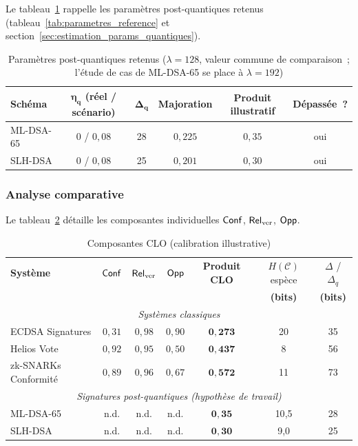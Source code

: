 \begin{sloppypar}
Le tableau~\ref{tab:coherence_pqc} rappelle les param\`etres post-quantiques
retenus (tableau~\ref{tab:parametres_reference} et
section~\ref{sec:estimation_params_quantiques}).

\begin{table}[htbp]
\centering
\caption{Param\`etres post-quantiques retenus ($\lambda = 128$, valeur commune de comparaison~; l'\'etude de cas de ML-DSA-65 se place \`a $\lambda = 192$)}
\label{tab:coherence_pqc}
\small
\begin{tabular}{lccccc}
\toprule
\textbf{Sch\'ema} & $\boldsymbol{\eta_q}$ \textbf{(r\'eel / sc\'enario)} & $\boldsymbol{\Delta_q}$ &
\textbf{Majoration} & \textbf{Produit illustratif} & \textbf{D\'epass\'ee~?} \\
\midrule
ML-DSA-65 & $0$ / $0{,}08$ & 28 & $0{,}225$ & $0{,}35$ & oui \\
SLH-DSA & $0$ / $0{,}08$ & 25 & $0{,}201$ & $0{,}30$ & oui \\
\bottomrule
\end{tabular}
\end{table}

\label{eq:decomposition_delta_q_validation}

\subsubsection{Analyse comparative}
\label{subsubsec:analyse_comparative_resultats}

Le tableau~\ref{tab:analyse_cro_comparative} d\'etaille les composantes
individuelles $\mathsf{Conf}$, $\mathsf{Rel}_{\mathrm{ver}}$, $\mathsf{Opp}$.

\begin{table}[htbp]
\centering
\caption{Composantes CLO (calibration illustrative)}
\label{tab:analyse_cro_comparative}
\small
\begin{tabular}{lcccccc}
\toprule
\textbf{Syst\`eme} & $\mathsf{Conf}$ & $\mathsf{Rel}_{\mathrm{ver}}$ & $\mathsf{Opp}$ & \textbf{Produit CLO} &
$H(\mathcal{C})$ esp\`ece & $\Delta$ / $\Delta_q$ \\
 & & & & & \textbf{(bits)} & \textbf{(bits)} \\
\midrule
\multicolumn{7}{c}{\textit{Syst\`emes classiques}} \\
\midrule
ECDSA Signatures & $0{,}31$ & $0{,}98$ & $0{,}90$ & $\mathbf{0{,}273}$ & 20 & 35 \\
Helios Vote & $0{,}92$ & $0{,}95$ & $0{,}50$ & $\mathbf{0{,}437}$ & 8 & 56 \\
zk-SNARKs Conformit\'e & $0{,}89$ & $0{,}96$ & $0{,}67$ & $\mathbf{0{,}572}$ & 11 & 73 \\
\midrule
\multicolumn{7}{c}{\textit{Signatures post-quantiques (hypoth\`ese de travail)}} \\
\midrule
ML-DSA-65 & n.d. & n.d. & n.d. & $\mathbf{0{,}35}$ & 10{,}5 & 28 \\
SLH-DSA & n.d. & n.d. & n.d. & $\mathbf{0{,}30}$ & 9{,}0 & 25 \\
\bottomrule
\end{tabular}


\end{table}
\end{sloppypar}
